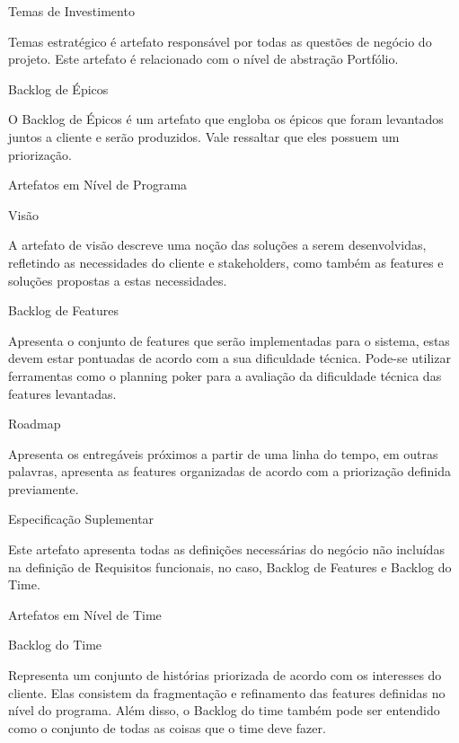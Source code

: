 {
	\large{Temas de Investimento \\}

	\tab Temas estratégico é artefato responsável por todas as questões de negócio do projeto. Este artefato é relacionado com o nível de abstração Portfólio. \\
}


{
	\large{Backlog de  Épicos \\}

	\tab O Backlog de Épicos é um artefato que engloba os épicos que foram levantados juntos a cliente e serão produzidos. Vale ressaltar que eles possuem um priorização. \\
}

{\large{Artefatos em Nível de Programa \\}}

{
	\large{Visão \\}

	\tab A artefato de visão descreve uma noção das soluções a serem desenvolvidas, refletindo as necessidades do cliente e stakeholders, como também as features e soluções propostas a estas necessidades. \\
}


{
	\large{Backlog de Features \\}

	\tab Apresenta o conjunto de features que serão implementadas para o sistema, estas devem estar pontuadas de acordo com a sua dificuldade técnica. Pode-se utilizar ferramentas como o planning poker para a avaliação da dificuldade técnica das features levantadas. \\
}

{
	\large{Roadmap \\}

	\tab Apresenta os entregáveis próximos a partir de uma linha do tempo, em outras palavras, apresenta as features organizadas de acordo com a priorização definida previamente. \\
}

{
	\large{Especificação Suplementar\\}

	\tab Este artefato apresenta todas as definições necessárias do negócio não incluídas na definição de Requisitos funcionais, no caso, Backlog de Features e Backlog do Time. \\
}

{\large{Artefatos em Nível de Time \\}}

{
	\large{Backlog do Time \\}

	\tab Representa um conjunto de histórias priorizada de acordo com os interesses do cliente. Elas consistem da fragmentação e refinamento das features definidas no nível do programa. Além disso, o Backlog do time também pode ser entendido como o conjunto de todas as coisas que o time deve fazer. \\
}

